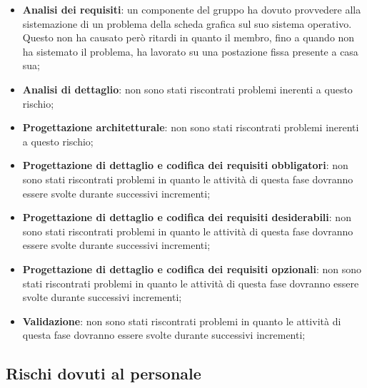 			\begin{itemize}
				\item \textbf{Analisi dei requisiti}: un componente del gruppo ha dovuto provvedere alla sistemazione di un problema della scheda grafica sul suo sistema operativo. \newline
				Questo non ha causato però ritardi in quanto il membro, fino a quando non ha sistemato il problema, ha lavorato su una postazione fissa presente a casa sua;
				\item \textbf{Analisi di dettaglio}: non sono stati riscontrati problemi inerenti a questo rischio;
				\item \textbf{Progettazione architetturale}: non sono stati riscontrati problemi inerenti a questo rischio;
				\item \textbf{Progettazione di dettaglio e codifica dei requisiti obbligatori}: non sono stati riscontrati problemi in quanto le attività di questa fase dovranno essere svolte durante successivi incrementi;
				\item \textbf{Progettazione di dettaglio e codifica dei requisiti desiderabili}: non sono stati riscontrati problemi in quanto le attività di questa fase dovranno essere svolte durante successivi incrementi;
				\item \textbf{Progettazione di dettaglio e codifica dei requisiti opzionali}: non sono stati riscontrati problemi in quanto le attività di questa fase dovranno essere svolte durante successivi incrementi;
				\item \textbf{Validazione}: non sono stati riscontrati problemi in quanto le attività di questa fase dovranno essere svolte durante successivi incrementi;
			\end{itemize}


	
	\subsection{Rischi dovuti al personale} %
	\label{sub:rischi_dovuti_al_personale}
